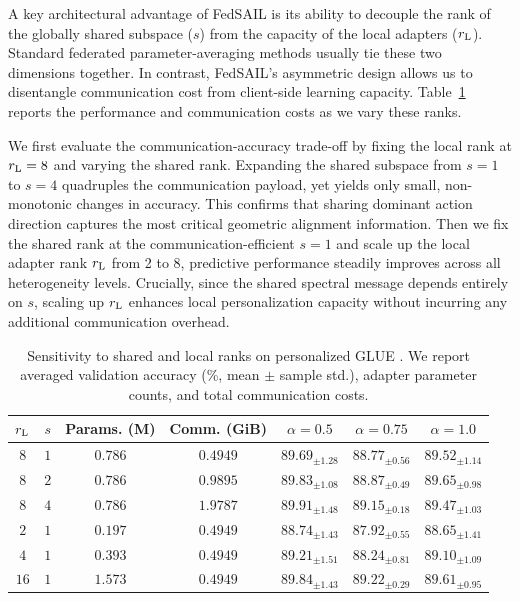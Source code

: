 \documentclass[11pt,letterpaper]{article}
\begin{document}
A key architectural advantage of FedSAIL is its ability to decouple the rank of the globally shared subspace ($s$) from the capacity of the local adapters ($r_{\rm L}$). Standard federated parameter-averaging methods usually tie these two dimensions together. In contrast, FedSAIL's asymmetric design allows us to disentangle communication cost from client-side learning capacity. Table~\ref{tab:glue-capacity-tradeoff} reports the performance and communication costs as we vary these ranks. 


We first evaluate the communication-accuracy trade-off by fixing the local rank at $r_{\rm L}=8$ and varying the shared rank. Expanding the shared subspace from $s=1$ to $s=4$ quadruples the communication payload, yet yields only small, non-monotonic changes in accuracy. This confirms that sharing dominant action direction captures the most critical geometric alignment information. Then we fix the shared rank at the communication-efficient $s=1$ and scale up the local adapter rank $r_{\rm L}$ from 2 to 8, predictive performance steadily improves across all heterogeneity levels. Crucially, since the shared spectral message depends entirely on $s$, scaling up $r_{\rm L}$ enhances local personalization capacity without incurring any additional communication overhead.

\begin{table}[htbp!]
    \centering
    \caption{Sensitivity to shared and local ranks on personalized GLUE . We report averaged validation accuracy (\%, mean $\pm$ sample std.), adapter parameter counts, and total communication costs.}
    \label{tab:glue-capacity-tradeoff}
    \small
    \setlength{\tabcolsep}{6pt}
    \begin{tabular*}{\linewidth}{@{\extracolsep{\fill}}ccccccc@{}}
        \toprule
        $r_{\rm L}$ & $s$ & Params. (M) & Comm. (GiB)
        & $\alpha=0.5$ & $\alpha=0.75$ & $\alpha=1.0$ \\
        \midrule
        $8$ & $1$ & $0.786$ & $0.4949$ & $89.69_{\pm 1.28}$ & $88.77_{\pm 0.56}$ & $89.52_{\pm 1.14}$ \\
        $8$ & $2$ & $0.786$ & $0.9895$ & $89.83_{\pm 1.08}$ & $88.87_{\pm 0.49}$ & $\mathbf{89.65}_{\pm 0.98}$ \\
        $8$ & $4$ & $0.786$ & $1.9787$ & $\mathbf{89.91}_{\pm 1.48}$ & $89.15_{\pm 0.18}$ & $89.47_{\pm 1.03}$ \\
        \midrule
        $2$ & $1$ & $0.197$ & $0.4949$ & $88.74_{\pm 1.43}$ & $87.92_{\pm 0.55}$ & $88.65_{\pm 1.41}$ \\
        $4$ & $1$ & $0.393$ & $0.4949$ & $89.21_{\pm 1.51}$ & $88.24_{\pm 0.81}$ & $89.10_{\pm 1.09}$ \\
        $16$ & $1$ & $1.573$ & $0.4949$ & $89.84_{\pm 1.43}$ & $\mathbf{89.22}_{\pm 0.29}$ & $89.61_{\pm 0.95}$ \\
        \bottomrule
    \end{tabular*}
\end{table}
\end{document}
